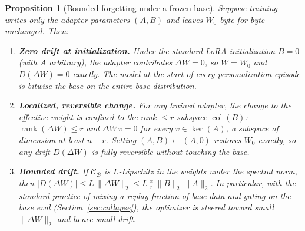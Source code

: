\documentclass[11pt]{article}
\newtheorem{proposition}{Proposition}
\begin{document}
\begin{proposition}[Bounded forgetting under a frozen base]
\label{prop:forget}
Suppose training writes only the adapter parameters $(A,B)$ and leaves $W_0$ byte-for-byte unchanged. Then:
\begin{enumerate}
    \item[(i)] \textbf{Zero drift at initialization.} Under the standard LoRA initialization $B=0$ (with $A$ arbitrary), the adapter contributes $\Delta W = 0$, so $W = W_0$ and $D(\Delta W) = 0$ exactly. The model at the start of every personalization episode is bitwise the base on the entire base distribution.
    \item[(ii)] \textbf{Localized, reversible change.} For any trained adapter, the change to the effective weight is confined to the rank-$\le r$ subspace $\operatorname{col}(B)$: $\operatorname{rank}(\Delta W) \le r$ and $\Delta W\, v = 0$ for every $v \in \ker(A)$, a subspace of dimension at least $n-r$. Setting $(A,B) \leftarrow (A,0)$ restores $W_0$ exactly, so any drift $D(\Delta W)$ is fully reversible without touching the base.
    \item[(iii)] \textbf{Bounded drift.} If $\mathcal{C}_{\mathcal{B}}$ is $L$-Lipschitz in the weights under the spectral norm, then $|D(\Delta W)| \le L\,\|\Delta W\|_2 \le L\,\tfrac{\alpha}{r}\,\|B\|_2\,\|A\|_2$. In particular, with the standard practice of mixing a replay fraction of base data and gating on the base eval (Section~\ref{sec:collapse}), the optimizer is steered toward small $\|\Delta W\|_2$ and hence small drift.
\end{enumerate}
\end{proposition}
\end{document}
